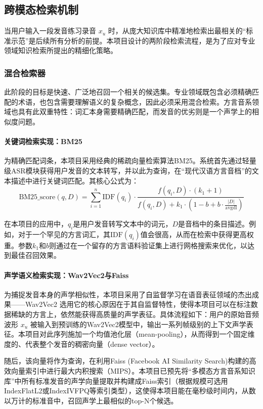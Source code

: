 \subsection{跨模态检索机制}
当用户输入一段发音练习录音 $x_u$ 时，从庞大知识库中精准地检索出最相关的“标准示范”是后续所有分析的前提。本项目设计的两阶段检索流程，是为了应对专业领域知识检索所提出的精细化策略。

\subsubsection{混合检索器}
此阶段的目标是快速、广泛地召回一个相关的候选集。专业领域既包含必须精确匹配的术语，也包含需要理解语义的复杂概念，因此必须采用混合检索。方言音系领域也具有此双重特性：词汇本身需要精确匹配，而发音的优劣则是一个声学上的相似度问题。

\paragraph{关键词检索实现：BM25}
为精确匹配词条，本项目采用经典的稀疏向量检索算法BM25。系统首先通过轻量级ASR模块获得用户发音的文本转写，并以此为查询，在“现代汉语方言音档”的文本描述中进行关键词匹配。其核心公式为：
\begin{equation}
\text{BM25\_score}(q, D) = \sum_{i=1}^{n} \text{IDF}(q_i) \cdot \frac{f(q_i, D) \cdot (k_1 + 1)}{f(q_i, D) + k_1 \cdot (1 - b + b \cdot \frac{|D|}{\text{avgdl}})}
\end{equation}

在本项目的应用中，$q_i$是用户发音转写文本中的词元，$D$是音档中的条目描述。例如，对于一个罕见的方言词汇，其$\text{IDF}(q_i)$值会很高，从而在检索中获得更高权重。参数$k_1$和$b$则通过在一个留存的方言语料验证集上进行网格搜索来优化，以达到最佳召回效果。

\paragraph{声学语义检索实现：Wav2Vec2与Faiss}
为捕捉发音本身的声学相似性，本项目采用了自监督学习在语音表征领域的杰出成果——Wav2Vec2 选用它的核心原因在于其自监督特性，使得本项目可以在标注数据稀缺的方言上，依然能获得高质量的声学表征。具体流程如下：用户的原始音频波形 $x_u$ 被输入到预训练的Wav2Vec2模型中，输出一系列帧级别的上下文声学表征。本项目对此序列施加一个均值池化层（mean-pooling），从而得到一个固定维度的、代表整个发音的稠密向量（dense vector）。

随后，该向量将作为查询，在利用Faiss (Facebook AI Similarity Search)构建的高效向量索引中进行最大内积搜索（MIPS）。本项目已预先将“多模态方言音系知识库”中所有标准发音的声学向量提取并构建成Faiss索引（根据规模可选用IndexFlatL2或IndexIVFPQ等索引类型），这使得本项目能在毫秒级时间内，从数以万计的标准音中，召回声学上最相似的top-N个候选。

